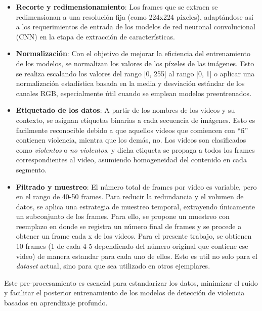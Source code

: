 \begin{itemize}

    \item \textbf{Recorte y redimensionamiento}: Los frames 
    que se extraen se redimensionan a una resolución fija 
    (como 224x224 píxeles), adaptándose así a los 
    requerimientos de entrada de los modelos de red neuronal 
    convolucional (CNN) en la etapa de extracción 
    de características.

    \item \textbf{Normalización}: Con el objetivo de mejorar 
    la eficiencia del entrenamiento de los modelos, se 
    normalizan los valores de los píxeles de las imágenes. 
    Esto se realiza escalando los valores del rango [0, 255] 
    al rango [0, 1] o aplicar una normalización estadística 
    basada en la media y desviación estándar de los canales 
    RGB, especialmente útil cuando se emplean modelos 
    preentrenados.

    \item \textbf{Etiquetado de los datos}: A partir de los 
    nombres de los videos y su contexto, se asignan etiquetas 
    binarias a cada secuencia de imágenes. Esto es facilmente 
    reconocible debido a que aquellos videos que comiencen con 
    ``fi'' contienen violencia, mientra que los demás, no. 
    Los videos son  clasificados como \textit{violentos} o 
    \textit{no violentos}, y dicha etiqueta se propaga a 
    todos los frames correspondientes al video, asumiendo 
    homogeneidad del contenido en cada segmento.

    \item \textbf{Filtrado y muestreo}: El número total de frames por 
    video es variable, pero en el rango de 40-50 frames.
    Para reducir la redundancia y el volumen de datos, se aplica una 
    estrategia de muestreo temporal, extrayendo únicamente un 
    subconjunto de los frames. Para ello, se propone un 
    muestreo con reemplazo en donde se registra un número final 
    de frames y se procede a obtener un frame cada x de los videos. 
    Para el presente trabajo, se obtienen 10 frames (1 de cada 4-5 
    dependiendo del número original que contiene ese video) de manera 
    estandar para cada uno de ellos. Esto es util no solo para el 
    \textit{dataset} actual, sino para que sea utilizado en 
    otros ejemplares.
\end{itemize}

Este pre-procesamiento es esencial para estandarizar 
los datos, minimizar el ruido y facilitar el posterior 
entrenamiento de los modelos de detección de violencia basados 
en aprendizaje profundo.\\

